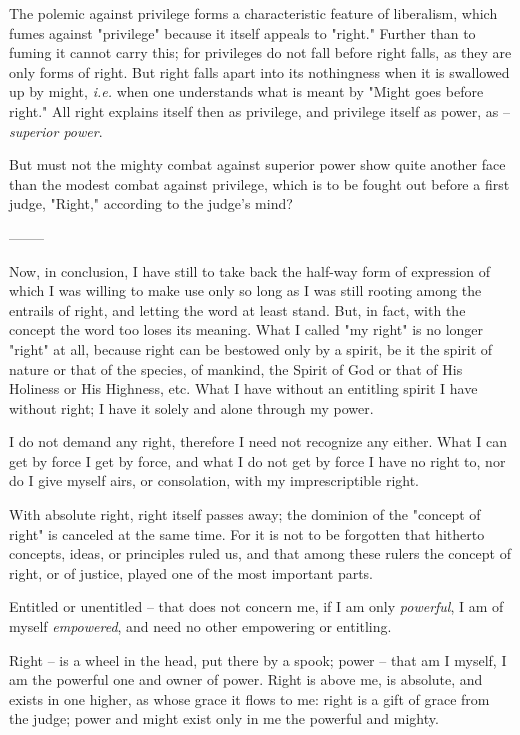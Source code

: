 The polemic against privilege forms a characteristic feature of liberalism, 
which fumes against "{}privilege"{} because it itself appeals to "{}right."{} 
Further than to fuming it cannot carry this; for privileges do not fall before 
right falls, as they are only forms of right. But right falls apart into its 
nothingness when it is swallowed up by might, \textit{i.e.} when one 
understands what is meant by "{}Might goes before right."{} All right explains 
itself then as privilege, and privilege itself as power, as -- 
\textit{superior power}.

But must not the mighty combat against superior power show quite another face 
than the modest combat against privilege, which is to be fought out before a 
first judge, "{}Right,"{} according to the judge's mind?

\begin{center}
--------\end{center}


Now, in conclusion, I have still to take back the half-way form of expression 
of which I was willing to make use only so long as I was still rooting among 
the entrails of right, and letting the word at least stand. But, in fact, with 
the concept the word too loses its meaning. What I called "{}my right"{} is no 
longer "{}right"{} at all, because right can be bestowed only by a spirit, be 
it the spirit of nature or that of the species, of mankind, the Spirit of God 
or that of His Holiness or His Highness, etc. What I have without an entitling 
spirit I have without right; I have it solely and alone through my power.

I do not demand any right, therefore I need not recognize any either. What I 
can get by force I get by force, and what I do not get by force I have no 
right to, nor do I give myself airs, or consolation, with my imprescriptible 
right.

With absolute right, right itself passes away; the dominion of the "{}concept 
of right"{} is canceled at the same time. For it is not to be forgotten that 
hitherto concepts, ideas, or principles ruled us, and that among these rulers 
the concept of right, or of justice, played one of the most important parts.

Entitled or unentitled -- that does not concern me, if I am only 
\textit{powerful}, I am of myself \textit{empowered}, and need no other 
empowering or entitling.

Right -- is a wheel in the head, put there by a spook; power -- that am I 
myself, I am the powerful one and owner of power. Right is above me, is 
absolute, and exists in one higher, as whose grace it flows to me: right is a 
gift of grace from the judge; power and might exist only in me the powerful 
and mighty.


